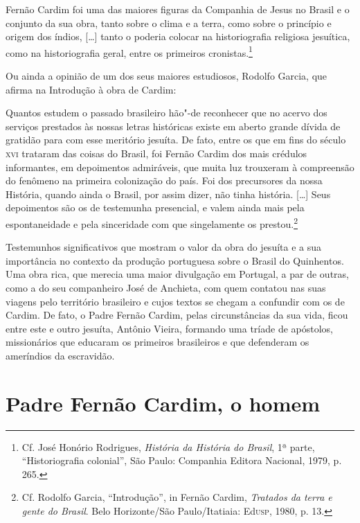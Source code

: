 \begin{hedraquote} 
Fernão Cardim foi uma das maiores figuras da
Companhia de Jesus no Brasil e o conjunto da sua obra, tanto sobre o
clima e a terra, como sobre o princípio e origem dos índios, [\ldots{}]
tanto o poderia colocar na historiografia religiosa jesuítica, como na
historiografia geral, entre os primeiros cronistas.\footnote{ Cf. 
José Honório Rodrigues, \textit{História da História do Brasil}, 
1ª parte, ``Historiografia colonial'', São Paulo: Companhia Editora
Nacional, 1979, p. 265.}
\end{hedraquote}

Ou ainda a opinião de um dos seus maiores estudiosos, Rodolfo
Garcia, que afirma na Introdução à obra de Cardim:

\begin{hedraquote} 
Quantos estudem o passado brasileiro hão"-de reconhecer que
no acervo dos serviços prestados às nossas letras históricas existe em
aberto grande dívida de gratidão para com esse meritório jesuíta. De
fato, entre os que em fins do século \textsc{xvi} trataram das coisas do
Brasil, foi Fernão Cardim dos mais crédulos informantes, em depoimentos
admiráveis, que muita luz trouxeram à compreensão do fenômeno na
primeira colonização do país. Foi dos precursores da nossa História,
quando ainda o Brasil, por assim dizer, não tinha história. [\ldots{}] Seus
depoimentos são os de testemunha presencial, e valem ainda mais pela
espontaneidade e pela sinceridade com que singelamente os prestou.\footnote{ Cf. 
Rodolfo Garcia, ``Introdução'', in Fernão Cardim, \textit{Tratados da terra e 
gente do Brasil}. Belo Horizonte/São Paulo/Itatiaia: Ed\textsc{usp}, 1980, p. 13.} 
\end{hedraquote}

Testemunhos significativos que mostram o valor da obra do
jesuíta e a sua importância no contexto da produção portuguesa sobre o
Brasil do Quinhentos. Uma obra rica, que merecia uma maior divulgação em
Portugal, a par de outras, como a do seu companheiro José de Anchieta,
com quem contatou nas suas viagens pelo território brasileiro e cujos
textos se chegam a confundir com os de Cardim. De fato, o Padre Fernão
Cardim, pelas circunstâncias da sua vida, ficou entre este e outro
jesuíta, Antônio Vieira, formando uma tríade de apóstolos, missionários
que educaram os primeiros brasileiros e que defenderam os ameríndios da
escravidão. 

\section*{Padre Fernão Cardim, o homem}

